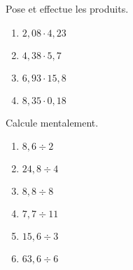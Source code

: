 \begin{exercice} %
Pose et effectue les produits.
\begin{enumerate} 
 \item $2,08 \cdot 4,23$ \dotfill \hspace*{11em}
 
 \item $4,38 \cdot 5,7$ \dotfill \hspace*{11em}
 
 \item $6,93 \cdot 15,8$ \dotfill \hspace*{11em}
 
 \item $8,35 \cdot 0,18 $\dotfill \hspace*{11em} 
 
 \end{enumerate}
\end{exercice}


\begin{exercice} %
Calcule mentalement.
\begin{enumerate} 
 \item $ 8,6 \div 2$ \dotfill \hspace*{11em}
 
 \item $ 24,8 \div 4$\dotfill \hspace*{11em}
 
 \item $ 8,8 \div 8$\dotfill \hspace*{11em}
 
 \item $ 7,7 \div 11$\dotfill \hspace*{11em}
 
 \item $ 15,6 \div 3$ \dotfill \hspace*{11em}
 
 \item $ 63,6 \div 6$ \dotfill \hspace*{11em}
 
 \end{enumerate}
\end{exercice}


